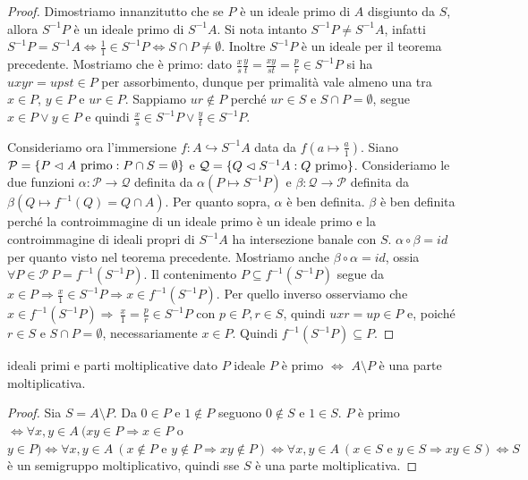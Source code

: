 \begin{proof}
    Dimostriamo innanzitutto che se $P$ è un ideale primo di $A$ disgiunto da $S$, allora $S^{-1}P$ è un ideale primo di $S^{-1}A$. Si nota intanto $S^{-1}P \neq S^{-1}A$, infatti $S^{-1}P = S^{-1}A \iff \frac{1}{1} \in S^{-1}P \iff S \cap P \neq \emptyset$. Inoltre $S^{-1}P$ è un ideale per il teorema precedente. Mostriamo che è primo: dato $\frac{x}{s} \frac{y}{t} = \frac{xy}{st} = \frac{p}{r} \in S^{-1}P$ si ha $uxyr = upst \in P$ per assorbimento, dunque per primalità vale almeno una tra $x \in P$, $y \in P$ e $ur \in P$. Sappiamo $ur \notin P$ perché $ur \in S$ e $S \cap P = \emptyset$, segue $x \in P \lor y \in P$ e quindi $\frac{x}{s} \in S^{-1}P \lor \frac{y}{t} \in S^{-1}P$.
    
    Consideriamo ora l'immersione $f : A \hookrightarrow S^{-1}A$ data da $f(a \mapsto \frac{a}{1})$.
    Siano $\mathcal{P} = \{P \vartriangleleft A \text{ primo} : P \cap S = \emptyset\}$ e $\mathcal{Q} = \{Q \vartriangleleft S^{-1}A : Q \text{ primo}\}$.
    Consideriamo le due funzioni $\alpha: \mathcal{P} \rightarrow \mathcal{Q}$ definita da $\alpha(P \mapsto S^{-1}P)$ e $\beta: \mathcal{Q} \rightarrow \mathcal{P}$ definita da $\beta(Q \mapsto f^{-1}(Q) = Q \cap A)$. Per quanto sopra, $\alpha$ è ben definita. $\beta$ è ben definita perché la controimmagine di un ideale primo è un ideale primo e la controimmagine di ideali propri di $S^{-1}A$ ha intersezione banale con $S$.
    $\alpha \circ \beta = id$ per quanto visto nel teorema precedente. Mostriamo anche $\beta \circ \alpha = id$, ossia $\forall P \in \mathcal{P} \ P = f^{-1}(S^{-1}P)$. Il contenimento $P \subseteq f^{-1}(S^{-1}P)$ segue da $x \in P \Rightarrow \frac{x}{1} \in S^{-1}P \Rightarrow x \in f^{-1}(S^{-1}P)$. Per quello inverso osserviamo che $x \in f^{-1}(S^{-1}P) \Rightarrow  \ \frac{x}{1} = \frac{p}{r} \in S^{-1}P$ con $p\in P, r \in S$, quindi $uxr = up \in P$ e, poiché $r \in S$ e $S \cap P = \emptyset$, necessariamente $x \in P$. Quindi $f^{-1}(S^{-1}P) \subseteq P$.
\end{proof}
\begin{proposition}{ideali primi e parti moltiplicative}
    dato $P$ ideale $P$ è primo $\iff$ $A \setminus P$ è una parte moltiplicativa.
\end{proposition}
\begin{proof}
    Sia $S = A \setminus P$. Da $0 \in P$ e $1 \notin P$ seguono $0 \notin S$ e $1 \in S$.
    $P$ è primo $\iff \forall x,y \in A \ (xy \in P \Rightarrow x \in P$ o $y \in P) \iff \forall x,y \in A \ (x \not \in P \text{ e } y \not \in P \Rightarrow xy \not \in P) \iff \forall x,y \in A \ (x \in S \text{ e } y \in S \Rightarrow xy \in S) \iff S$ è un semigruppo moltiplicativo, quindi sse $S$ è una parte moltiplicativa. 
\end{proof}
